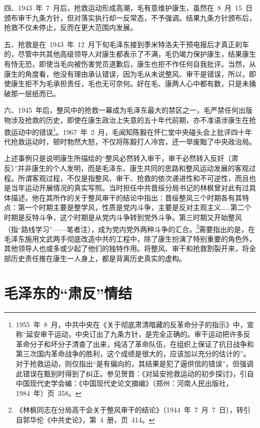 四、1943~年~7~月后，抢救运动形成高潮，毛有意维护康生，虽然在~8~月~15~日颁布审干九条方针，但对落实执行却一反常态，不予强调。结果九条方针颁布后，抢救不仅未停止，反而在更大范围内发展。

五、抢救是在~1943~年~12~月下旬毛泽东接到季米特洛夫干预电报后才真正刹车的，尽管中共其他高级领导人对康生都表示了不满，毛仍竭力保护康生，结果康生有恃无恐，即使当毛向被伤害党员道歉后，康生也拒不作任何自我批评。当然，从康生的角度看，他没有理由承认错误，因为毛从未说整风、审干是错误，所以，即使康生拒不为毛承担责任，毛也无可奈何。好在毛、康两人心中都有数，只是未捅破那一层纸而已。

六、1945~年后，整风中的抢救一幕成为毛泽东最大的禁区之一，毛严禁任何出版物涉及抢救的历史，即使在康生政治上失意的五十年代前期，亦不准语涉康生在抢救运动中的错误\footnote{1955~年~8~月，中共中央在《关于彻底肃清暗藏的反革命分子的指示》中，宣称“延安审干运动，中央订出了九条方针，是完全正确的。审干运动把许多反革命分子和坏分子清查了出来，纯洁了革命队伍，在组织上保证了抗日战争和第三次国内革命战争的胜利，这个成绩是很大的，应该加以充分的估计的”。对于抢救运动，则仅指出“是有偏向的，其结果是犯了逼供信的错误”，但强调此错误在甄别时得到了纠正。参见贺晋：《对延安抢救运动的初步探讨》，引自中国现代史学会编：《中国现代史论文摘编》（郑州：河南人民出版社，1984~年）页~358。}。1967~年~2~月，毛闻知陈毅在怀仁堂中央碰头会上批评四十年代抢救运动时，顿时勃然大怒，不仅将陈毅打人冷宫，还一举废黜了中央政治局。

上述事例只是说明康生所描绘的“整风必然转入审干，审干必然转入反奸（肃反）”并非康生的个人发明，而是毛泽东、康生共同的思路和整风运动发展的客观过程。所谓客观过程，不仅是指整风、审干、抢救的依次递进性和不可逆性，而且也是当年运动开展情况的真实写照。当时担任中共晋绥分局书记的林枫曾对此有过具体描述，他在其所作的关于整风审干的结论中指出：晋绥整风三个时期各有其特点：第一个时期主要是整学风，性质是党内斗争，主要是反对主观主义……第二个时期是反特斗争，这个时期是从党内斗争转到党外斗争。第三时期又开始整风（指“路线学习”——笔者注），成为党内党外两种斗争的汇合。\footnote{《林枫同志在分局高干会关于整风审干的结论》（1944~年~7~月~7~日），转引自郭华伦《中共史论》，第~4~册，页~414。}需要指出的是，在毛泽东施用文武两手彻底改造中共的工程中，除了康生扮演了特别重要的角色外，其他领导人也或多或少起了他们的独特作用。将整风、审干和抢救割裂开来，将全部历史责任推在康生一人身上，都是背离历史真实的虚构。

\section{毛泽东的“肃反”情结}

